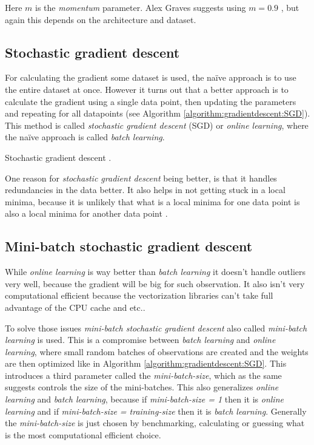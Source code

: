 Here $m$ is the \textit{momentum} parameter. Alex Graves suggests using $m = 0.9$ \cite{alexgraves}, but again this depends on the architecture and dataset.

\subsection{Stochastic gradient descent}

For calculating the gradient some dataset is used, the naïve approach is to use the entire dataset at once. However it turns out that a better approach is to calculate the gradient using a single data point, then updating the parameters and repeating for all datapoints (see Algorithm \ref{algorithm:gradientdescent:SGD}). This method is called \textit{stochastic gradient descent} (SGD) or \textit{online learning}, where the naïve approach is called \textit{batch learning}.

\begin{algorithm}[h]
 \DontPrintSemicolon
 \caption{Stochastic gradient descent \cite{alexgraves}.}
 \label{algorithm:gradientdescent:SGD}
\end{algorithm}

One reason for \textit{stochastic gradient descent} being better,   is that it handles redundancies in the data better. It also helps in not getting stuck in a local minima, because it is unlikely that what is a local minima for one data point is also a local minima for another data point \cite{bishop}.

\subsection{Mini-batch stochastic gradient descent}

While \textit{online learning} is way better than \textit{batch learning} it doesn't handle outliers very well, because the gradient will be big for such observation. It also isn't very computational efficient because the vectorization libraries can't take full advantage of the CPU cache and etc..

To solve those issues \textit{mini-batch stochastic gradient descent} also called \textit{mini-batch learning} is used. This is a compromise between \textit{batch learning} and \textit{online learning}, where small random batches of observations are created and the weights are then optimized like in Algorithm \ref{algorithm:gradientdescent:SGD}. This introduces a third parameter called the \textit{mini-batch-size}, which as the same suggests controls the size of the mini-batches. This also generalizes \textit{online learning} and \textit{batch learning}, because if \textit{mini-batch-size = 1} then it is \textit{online learning} and if \textit{mini-batch-size = training-size} then it is \textit{batch learning}. Generally the \textit{mini-batch-size} is just chosen by benchmarking, calculating or guessing what is the most computational efficient choice.

